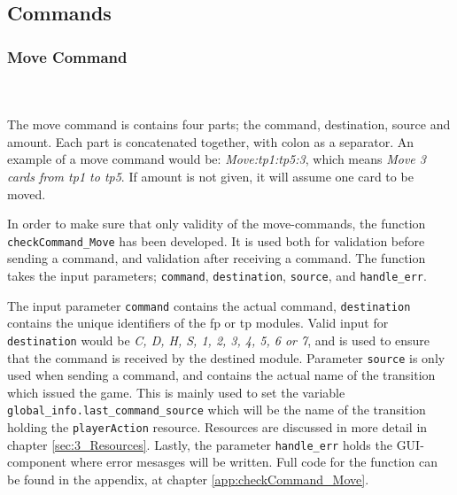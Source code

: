 \documentclass[runningheads,a4paper]{llncs}
\begin{document}
\subsection{Commands}
\subsubsection{Move Command}~\\~\\
\label{sec:3_move_command}
The move command is contains four parts; the command, destination, source and amount. Each part is concatenated together, with colon as a separator. An example of a move command would be: \textit{Move:\ac{tp}1:\ac{tp}5:3}, which means \textit{Move 3 cards from \ac{tp}1 to \ac{tp}5}. If amount is not given, it will assume one card to be moved.
\newline

In order to make sure that only validity of the move-commands, the function \verb!checkCommand_Move! has been developed. It is used both for validation before sending a command, and validation after receiving a command. The function takes the input parameters; \verb!command!, \verb!destination!, \verb!source!, and \verb!handle_err!. 
\newline

The input parameter \verb!command! contains the actual command, \verb!destination! contains the unique identifiers of the \ac{fp} or \ac{tp} modules. Valid input for \verb!destination! would be \textit{C, D, H, S, 1, 2, 3, 4, 5, 6 or 7}, and is used to ensure that the command is received by the destined module. Parameter \verb!source! is only used when sending a command, and contains the actual name of the transition which issued the game. This is mainly used to set the variable \verb!global_info.last_command_source! which will be the name of the transition holding the \verb!playerAction! resource. Resources are discussed in more detail in chapter \ref{sec:3_Resources}. Lastly, the parameter \verb!handle_err! holds the GUI-component where error mesasges will be written. Full code for the function can be found in the appendix, at chapter \ref{app:checkCommand_Move}.
\\
\end{document}
